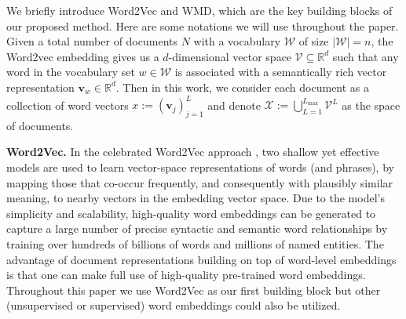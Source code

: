 \documentclass[11pt,a4paper]{article}
\newcommand{\R}{\mathbb{R}}
\newcommand{\W}{\mathcal{W}}
\newcommand{\X}{\mathcal{X}}
\newcommand{\V}{\mathcal{V}}
\newcommand{\1}{\boldsymbol{1}}
\newcommand{\bv}{\boldsymbol{v}}
\begin{document}
We briefly introduce Word2Vec and WMD, which are the key  building blocks of our proposed method. Here are some notations we will use throughout the paper. Given a total number of documents $N$ with a vocabulary $\W$ of size $|\W|=n$, the Word2vec embedding gives us a $d$-dimensional vector space $\V \subseteq \R^d$ such that any word in the vocabulary set $w\in \W$ is associated with a semantically rich vector representation $\bv_w\in \R^d$. Then in this work, we consider each document as a collection of word vectors $x:=(\bv_{j})_{j=1}^L$ and denote $\X:=\bigcup_{L=1}^{L_{\max}}\V^{L}$ as the space of documents.

\vskip0.1in
\noindent
\textbf{Word2Vec.} 
In the celebrated Word2Vec approach \cite{mikolov2013efficient,mikolov2013distributed}, two shallow yet effective models are used to learn vector-space representations of words (and phrases), by mapping those that co-occur frequently, and consequently with plausibly similar meaning, to nearby vectors in the embedding vector space. Due to the model's simplicity and scalability, high-quality word embeddings can be generated to capture a large number of precise syntactic and semantic word relationships by training over hundreds of billions of words and millions of named entities. The advantage of document representations building on top of word-level embeddings is that one can make full use of high-quality pre-trained word embeddings.
Throughout this paper we use Word2Vec as our first building block but other (unsupervised or supervised) word embeddings \cite{pennington2014glove,wieting2015ppdb} could also be utilized. 
\end{document}
